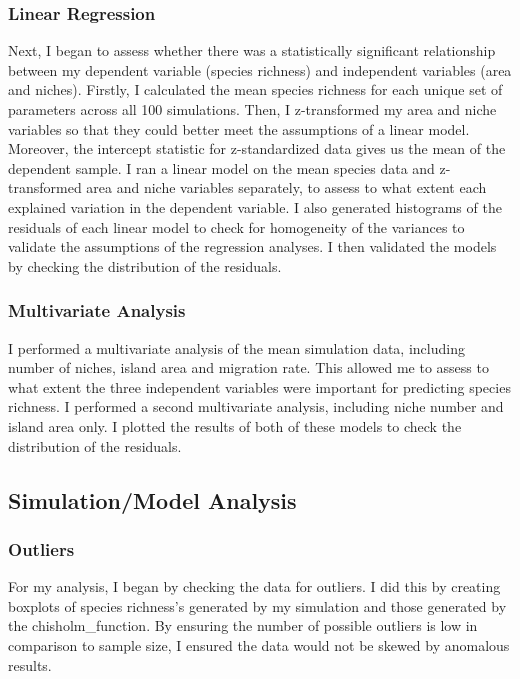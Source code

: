 \documentclass{article}
\begin{document}
\subsubsection{Linear Regression}
Next, I began to assess whether there was a statistically significant relationship between my dependent variable (species richness) and independent variables (area and niches). Firstly, I calculated the mean species richness for each unique set of parameters across all 100 simulations. Then, I z-transformed my area and niche variables so that they could better meet the assumptions of a linear model. Moreover, the intercept statistic for z-standardized data gives us the mean of the dependent sample. I ran a linear model on the mean species data and z-transformed area and niche variables separately, to assess to what extent each explained variation in the dependent variable. I also generated histograms of the residuals of each linear model to check for homogeneity of the variances to validate the assumptions of the regression analyses. I then validated the models by checking the distribution of the residuals. 

\subsubsection{Multivariate Analysis}
I performed a multivariate analysis of the mean simulation data, including number of niches, island area and migration rate. This allowed me to assess to what extent the three independent variables were important for predicting species richness. I performed a second multivariate analysis, including niche number and island area only. I plotted the results of both of these models to check the distribution of the residuals.

\subsection{Simulation/Model Analysis}

\subsubsection{Outliers}
For my analysis, I began by checking the data for outliers. I did this by creating boxplots of species richness’s generated by my simulation and those generated by the chisholm\_function. By ensuring the number of possible outliers is low in comparison to sample size, I ensured the data would not be skewed by anomalous results.
\end{document}

